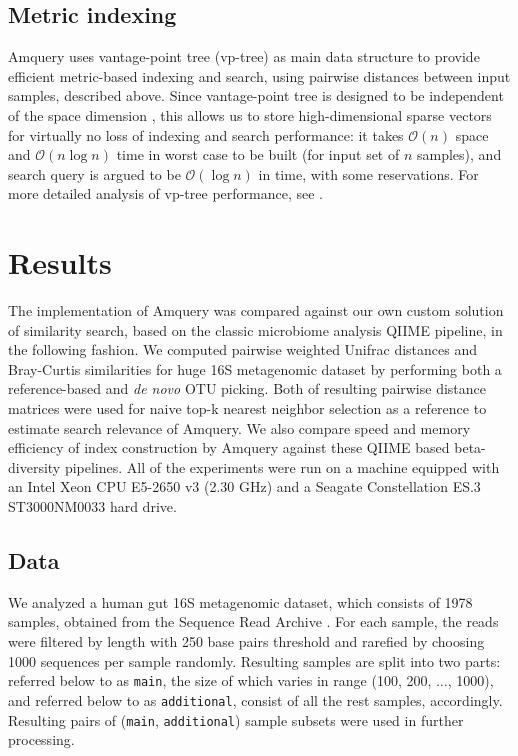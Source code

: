 \documentclass[10pt,letterpaper]{article}
\begin{document}
\subsection*{Metric indexing}
Amquery uses vantage-point tree (vp-tree) \cite{yianilos1993data, chavez2001searching} as main data structure to provide efficient metric-based indexing and search, using pairwise distances between input 
samples, described above.
Since vantage-point tree is designed to be independent of the space dimension \cite{yianilos1993data}, this allows us to store high-dimensional sparse vectors for virtually no loss of indexing and 
search performance: it takes $\mathcal{O}(n)$ space and $\mathcal{O}(n \log n)$ time in worst case to be built (for input set of $n$ samples), and search query is argued to be $\mathcal{O}(\log n)$ in time, with some reservations. 
For more detailed analysis of vp-tree performance, see \cite{yianilos1993data}.


\section*{Results}
The implementation of Amquery was compared against our own custom solution of similarity search, based on the classic microbiome analysis QIIME pipeline, in the following fashion.
We computed pairwise weighted Unifrac distances \cite{lozupone2011unifrac} and Bray-Curtis similarities for huge 16S metagenomic dataset by performing both a reference-based and \textit{de novo} OTU picking.
Both of resulting pairwise distance matrices were used for naive top-k nearest neighbor selection as a reference to estimate search relevance of Amquery. 
We also compare speed and memory efficiency of index construction by Amquery against these QIIME based beta-diversity pipelines.
All of the experiments were run on a machine equipped with an Intel Xeon CPU E5-2650 v3 (2.30 GHz) and a Seagate Constellation ES.3 ST3000NM0033 hard drive.

\subsection*{Data}
We analyzed a human gut 16S metagenomic dataset, which consists of 1978 samples, obtained from the Sequence Read Archive \cite{leinonen2010sequence}. 
For each sample, the reads were filtered by length with 250 base pairs threshold and rarefied by choosing 1000 sequences per sample randomly.
Resulting samples are split into two parts: referred below to as \texttt{main}, the size of which varies in range (100, 200, $\dots$, 1000), and referred below to as \texttt{additional}, 
consist of all the rest samples, accordingly. Resulting pairs of (\texttt{main}, \texttt{additional}) sample subsets were used in further processing.
\end{document}
